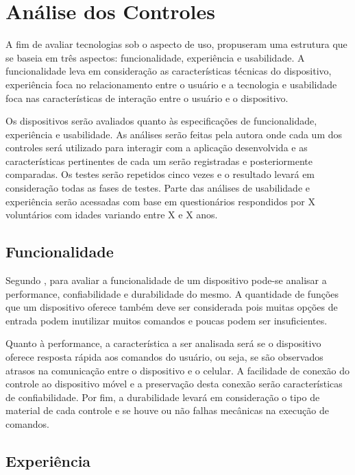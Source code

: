 \chapter{Análise dos Controles}
\label{c.analise}

A fim de avaliar tecnologias sob o aspecto de uso,  propuseram uma estrutura que se baseia em três aspectos: funcionalidade, experiência e usabilidade. A funcionalidade leva em consideração as características técnicas do dispositivo, experiência foca no relacionamento entre o usuário e a tecnologia e usabilidade foca nas características de interação entre o usuário e o dispositivo. 

Os dispositivos serão avaliados quanto às especificações de funcionalidade, experiência e usabilidade. As análises serão feitas pela autora onde cada um dos controles será utilizado para interagir com a aplicação desenvolvida e as características pertinentes de cada um serão registradas e posteriormente comparadas. Os testes serão repetidos cinco vezes e o resultado levará em consideração todas as fases de testes. Parte das análises de usabilidade e experiência serão acessadas com base em questionários respondidos por X voluntários com idades variando entre X e X anos.

\section{Funcionalidade}
\label{funcionalidade}

Segundo , para avaliar a funcionalidade de um dispositivo pode-se analisar a performance, confiabilidade e durabilidade do mesmo. A quantidade de funções que um dispositivo oferece também deve ser considerada pois muitas opções de entrada podem inutilizar muitos comandos e poucas podem ser insuficientes. 

Quanto à performance, a característica a ser analisada será se o dispositivo oferece resposta rápida aos comandos do usuário, ou seja, se são observados atrasos na comunicação entre o dispositivo e o celular. A facilidade de conexão do controle ao dispositivo móvel e a preservação desta conexão serão características de confiabilidade. Por fim, a durabilidade levará em consideração o tipo de material de cada controle e se houve ou não falhas mecânicas na execução de comandos.

\section{Experiência}
\label{experiencia}

